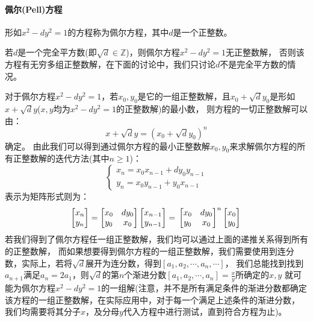 \documentclass{article}
\numberwithin{equation}{subsubsection}
\begin{document}
\paragraph{\textbf{佩尔(Pell)方程}}
形如$x^2-dy^2=1$的方程称为佩尔方程，其中$d$是一个正整数。\par
若$d$是一个完全平方数(即$\sqrt{d}\in\mathbb{Z}$)，则佩尔方程$x^2-dy^2=1$无正整数解，
否则该方程有无穷多组正整数解，在下面的讨论中，我们只讨论$d$不是完全平方数的情况。\par
对于佩尔方程$x^2-dy^2=1$，若$x_0,y_0$是它的一组正整数解，且$x_0+\sqrt{d}y_0$是形如$x+\sqrt{d}y$($x,y$均为$x^2-dy^2=1$的正整数解)的最小数，
则方程的一切正整数解可以由：
\begin{equation}
    x+\sqrt{d}y=(x_0+\sqrt{d}y_0)^n
    \nonumber
\end{equation}
确定。
由此我们可以得到通过佩尔方程的最小正整数解$x_0,y_0$来求解佩尔方程的所有正整数解的迭代方法(其中$n\ge1$)：
\begin{equation}
    \begin{cases}
        x_{n}=x_0x_{n-1}+dy_0y_{n-1}\\
        y_{n}=x_0y_{n-1}+y_0x_{n-1}
    \end{cases}
    \nonumber
\end{equation}
表示为矩阵形式则为：
\begin{equation}
    \begin{bmatrix}
        x_n\\
        y_n
    \end{bmatrix}=
    \begin{bmatrix}
        x_0&dy_0\\
        y_0&x_0
    \end{bmatrix}
    \begin{bmatrix}
        x_{n-1}\\
        y_{n-1}
    \end{bmatrix}=\\
    \begin{bmatrix}
        x_0&dy_0\\
        y_0&x_0
    \end{bmatrix}^n
    \begin{bmatrix}
        x_{0}\\
        y_{0}
    \end{bmatrix}\\
    \nonumber
\end{equation}
若我们得到了佩尔方程任一组正整数解，我们均可以通过上面的递推关系得到所有的正整数解，
而如果想要得到佩尔方程的一组正整数解，我们需要使用到连分数，实际上，若将$\sqrt{d}$展开为连分数，得到$[a_1,a_2,\cdots,a_n,\cdots]$，
我们总能找到找到$a_{n+1}$满足$a_n=2a_1$，则$\sqrt{d}$的第$n$个渐进分数$[a_1,a_2,\cdots,a_{n}]=\frac{x}{y}$所确定的$x,y$
就可能为佩尔方程$x^2-dy^2=1$的一组解(注意，并不是所有满足条件的渐进分数都确定该方程的一组正整数解，在实际应用中，对于每一个满足上述条件的渐进分数，
我们均需要将其分子$x$，及分母$y$代入方程中进行测试，直到符合方程为止)。
\end{document}
